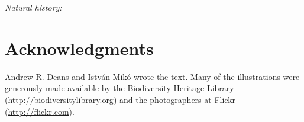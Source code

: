 \documentclass[letterpaper, 11pt]{article}
\begin{document}
\noindent{}\textit{Natural history:} \\

\FloatBarrier

\section*{Acknowledgments}
Andrew R. Deans and Istv\'an Mik\'o wrote the text. Many of the illustrations were generously made available by the Biodiversity Heritage Library (\url{http://biodiversitylibrary.org}) and the photographers at Flickr (\url{http://flickr.com}).

\FloatBarrier


\end{document}
